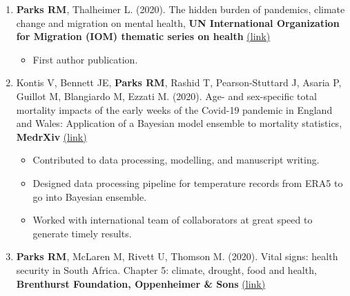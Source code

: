 \begin{enumerate}
\newpage

    \item \textbf{Parks RM}, Thalheimer L. (2020). The hidden burden of pandemics, climate change and migration on mental health, \textbf{UN International Organization for Migration (IOM) thematic series on health} \href{https://environmentalmigration.iom.int/blogs/hidden-burden-pandemics-climate-change-and-migration-mental-health}{(link)} 

    \begin{itemize}
        \item First author publication.
    \end{itemize}

    \item Kontis V, Bennett JE, \textbf{Parks RM}, Rashid T, Pearson-Stuttard J, Asaria P, Guillot M, Blangiardo M, Ezzati M. (2020). Age- and sex-specific total mortality impacts of the early weeks of the Covid-19 pandemic in England and Wales: Application of a Bayesian model ensemble to mortality statistics, \textbf{MedrXiv} \href{https://www.medrxiv.org/content/10.1101/2020.05.20.20107680v1}{(link)}

    \begin{itemize}
        \item Contributed to data processing, modelling, and manuscript writing.
        \item Designed data processing pipeline for temperature records from ERA5 to go into Bayesian ensemble.
        \item Worked with international team of collaborators at great speed to generate timely results.
    \end{itemize}

     \item \textbf{Parks RM}, McLaren M, Rivett U, Thomson M. (2020). Vital signs: health security in South Africa. Chapter 5: climate, drought, food and health, \textbf{Brenthurst Foundation, Oppenheimer \& Sons} \href{https://www.thebrenthurstfoundation.org/downloads/vital-signs-ebook-pdf.pdf}{(link)}


\end{enumerate}
